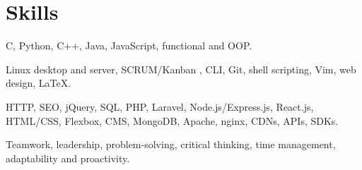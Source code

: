 \section{Skills}
{C, Python, C++, Java, JavaScript, functional and OOP.}

{Linux desktop and server, SCRUM/Kanban , CLI, Git, shell scripting, Vim, web design, {\LaTeX}.}

{HTTP, SEO, jQuery, SQL, PHP, Laravel, Node.js/Express.js, React.js, HTML/CSS, Flexbox, CMS, MongoDB, Apache, nginx, CDNs, APIs, SDKs.}

{Teamwork, leadership, problem-solving, critical thinking, time management, adaptability and proactivity.}
